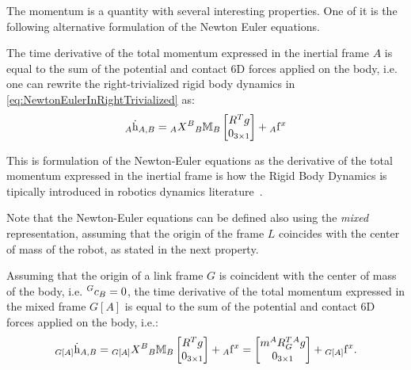 
The momentum is a quantity with several interesting properties. One of it is the following alternative formulation of the Newton Euler equations.

\begin{lemma}
The time derivative of the total momentum expressed in the inertial frame $A$ is equal to the sum of the potential and contact 6D forces applied on the body, i.e. one can rewrite the right-trivialized rigid body dynamics in \eqref{eq:NewtonEulerInRightTrivialized} as:
\begin{equation}
\hspace{0em}_A \dot{\mathrm{h}}_{A,B} = \hspace{0em}_A X^B \hspace{0em}_B \mathbb{M}_B \begin{bmatrix} R^T g \\ 0_{3 \times 1} \end{bmatrix} + \hspace{0em}_A {\rm f}^x 
\end{equation}
\end{lemma}

This is formulation of the Newton-Euler equations as the derivative of the total momentum expressed in the inertial frame is how the Rigid Body Dynamics is tipically introduced in robotics dynamics literature~\citep{featherstone2008}.

Note that the Newton-Euler equations can be defined also using the \emph{mixed} representation, assuming that the origin of the frame $L$ coincides with the center of mass of the robot, as stated in the next property.
\begin{lemma}
Assuming that the origin of a link frame $G$ is coincident with the center of mass of the body, i.e. $ \hspace{0em}^G c_B = 0$, the time derivative of the total momentum expressed in the mixed frame $G[A]$ is equal to the sum of the potential and contact 6D forces applied on the body, i.e.:
\begin{equation}
\hspace{0em}_{G[A]} \dot{\mathrm{h}}_{A,B} = 
\hspace{0em}_{G[A]} X^B \hspace{0em}_B \mathbb{M}_B \begin{bmatrix} R^T g \\ 0_{3 \times 1} \end{bmatrix} + \hspace{0em}_A {\rm f}^x  = 
\begin{bmatrix} m \hspace{0em}^A R^T_G \hspace{0em}^A g \\ 0_{3 \times 1} \end{bmatrix} + \hspace{0em}_{G[A]} {\rm f}^x .
\end{equation}
\end{lemma}

